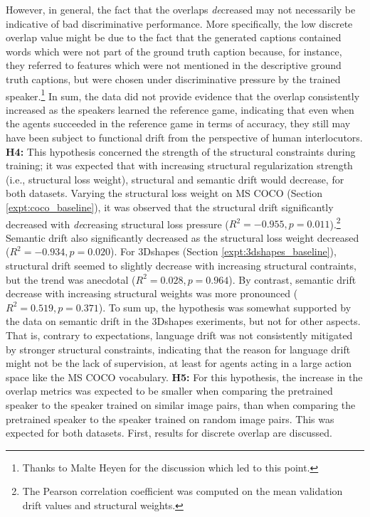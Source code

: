 However, in general, the fact that the overlaps \emph{de}creased may not necessarily be indicative of bad discriminative performance. More specifically, the low discrete overlap value might be due to the fact that the generated captions contained words which were not part of the ground truth caption because, for instance, they referred to features which were not mentioned in the descriptive ground truth captions, but were chosen under discriminative pressure by the trained speaker.\footnote{Thanks to Malte Heyen for the discussion which led to this point.} 
In sum, the data did not provide evidence that the overlap consistently increased as the speakers learned the reference game, indicating that even when the agents succeeded in the reference game in terms of accuracy, they still may have been subject to functional drift from the perspective of human interlocutors.\newline
\textbf{H4:} This hypothesis concerned the strength of the structural constraints during training; it was expected that with increasing structural regularization strength (i.e., structural loss weight), structural and semantic drift would decrease, for both datasets. Varying the structural loss weight on MS COCO (Section \ref{expt:coco_baseline}), it was observed that the structural drift significantly decreased with \textit{de}creasing structural loss pressure ($R^2 = -0.955, p = 0.011$).\footnote{The Pearson correlation coefficient was computed on the mean validation drift values and structural weights.} Semantic drift also significantly decreased as the structural loss weight decreased ($R^2 = -0.934, p =0.020$). For 3Dshapes (Section \ref{expt:3dshapes_baseline}), structural drift seemed to slightly decrease with increasing structural contraints, but the trend was anecdotal ($R^2=0.028, p = 0.964$). By contrast, semantic drift decrease with increasing structural weights was more pronounced ($R^2 = 0.519, p = 0.371$). To sum up, the hypothesis was somewhat supported by the data on semantic drift in the 3Dshapes exeriments, but not for other aspects. That is, contrary to expectations, language drift was not consistently mitigated by stronger structural constraints, indicating that the reason for language drift might not be the lack of supervision, at least for agents acting in a large action space like the MS COCO vocabulary. \newline
\textbf{H5:} For this hypothesis, the increase in the overlap metrics was expected to be smaller when comparing the pretrained speaker to the speaker trained on similar image pairs, than when comparing the pretrained speaker to the speaker trained on random image pairs. This was expected for both datasets. First, results for discrete overlap are discussed. 
